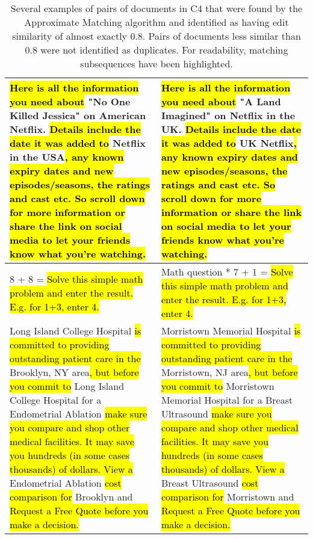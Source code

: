 \begin{table*}[htbp]
\begin{tabular}{p{.48\linewidth}|p{.48\linewidth}}
    \hl{Here is all the information you need about} "No One Killed Jessica" on American Netflix. \hl{Details include the date it was added to} Netflix in the USA\hl{, any known expiry dates and new episodes/seasons, the ratings and cast etc. So scroll down for more information or share the link on social media to let your friends know what you're watching.} &
    \hl{Here is all the information you need about} "A Land Imagined" on Netflix in the UK. \hl{Details include the date it was added to} UK Netflix\hl{, any known expiry dates and new episodes/seasons, the ratings and cast etc. So scroll down for more information or share the link on social media to let your friends know what you're watching.} \\
    \midrule
    8 + 8 = \hl{Solve this simple math problem and enter the result. E.g. for 1+3, enter 4.}
    & Math question * 7 + 1 = \hl{Solve this simple math problem and enter the result. E.g. for 1+3, enter 4.} \\
    \midrule
    Long Island College Hospital \hl{is committed to providing outstanding patient care in the} Brooklyn, NY area\hl{, but before you commit to} Long Island College Hospital for a Endometrial Ablation \hl{make sure you compare and shop other medical facilities. It may save you hundreds (in some cases thousands) of dollars. View a} Endometrial Ablation \hl{cost comparison for} Brooklyn and \hl{Request a Free Quote before you make a decision.} &
    Morristown Memorial Hospital \hl{is committed to providing outstanding patient care in the} Morristown, NJ area\hl{, but before you commit to} Morristown Memorial Hospital for a Breast Ultrasound \hl{make sure you compare and shop other medical facilities. It may save you hundreds (in some cases thousands) of dollars. View a} Breast Ultrasound \hl{cost comparison for} Morristown and \hl{Request a Free Quote before you make a decision.} \\
    \bottomrule
    \end{tabular}%
  \caption{Several examples of pairs of documents in C4 that were found by the Approximate Matching algorithm and identified as having edit similarity of almost exactly 0.8. Pairs of documents less similar than 0.8 were not identified as duplicates. For readability, matching subsequences have been highlighted.}
  \label{tab:qualitative_near_boundary}%
\end{table*}%
